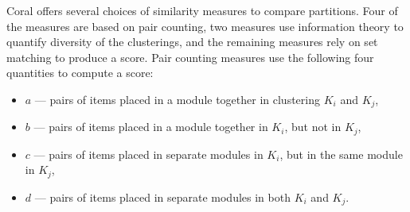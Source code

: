\documentclass[12pt]{cmuthesis}
\newcommand\Coral{Coral\xspace}
\begin{document}
  \Coral offers several choices of similarity measures to compare partitions. Four of the measures are based on pair counting, two measures use information theory to quantify diversity of the clusterings, and the remaining measures rely on set matching to produce a score. Pair counting measures use the following four quantities to compute a score:

  \begin{itemize}
  \item $a$ --- pairs of items placed in a module together in clustering $K_{i}$ and $K_{j}$,
  \item  $b$ --- pairs of items placed in a module together in $K_{i}$, but not in $K_{j}$,
  \item $c$ --- pairs of items placed in separate modules in $K_{i}$, but in the same module in $K_{j}$,
  \item $d$ --- pairs of items placed in separate modules in both $K_{i}$ and $K_{j}$.
  \end{itemize}
\end{document}
